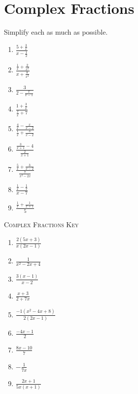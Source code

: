\chapter{Complex Fractions}

Simplify each as much as possible.

\begin{multicols}{3}
\begin{enumerate}
\setlength\itemsep{10pt}
\item $\frac{5+\frac{3}{x}}{x-\frac{1}{2}}$
\item $\frac{\frac{1}{x}+\frac{2}{x^2}}{x+\frac{8}{x^2}}$
\item $\frac{3}{2-\frac{x}{x-1}}$
\item $\frac{1+\frac{3}{x}}{\frac{2}{x}+7}$
\item $\frac{\frac{4}{x}-\frac{x}{x-2}}{\frac{1}{x}+{\frac{3}{x-2}}}$
\item $\frac{\frac{3}{x+1}-4}{\frac{2}{x+1}}$
\item $\frac{\frac{5}{x}+\frac{3}{x-2}}{\frac{7}{x^2-2x}}$
\item $\frac{\frac{1}{x}-\frac{1}{7}}{x-7}$
\item $\frac{\frac{1}{x}+\frac{1}{x+1}}{5}$
\end{enumerate}
\end{multicols}

\newpage

\textsc{Complex Fractions Key}

\begin{multicols}{3}
\begin{enumerate}
\setlength\itemsep{10pt}
\item $\frac{2(5x+3)}{x(2x-1)}$
\item $\frac{1}{x^2-2x+4}$
\item $\frac{3(x-1)}{x-2}$
\item $\frac{x+3}{2+7x}$
\item $\frac{-1(x^2-4x+8)}{2(2x-1)}$
\item $\frac{-4x-1}{2}$
\item $\frac{8x-10}{7}$
\item $-\frac{1}{7x}$
\item $\frac{2x+1}{5x(x+1)}$
\end{enumerate}
\end{multicols}
